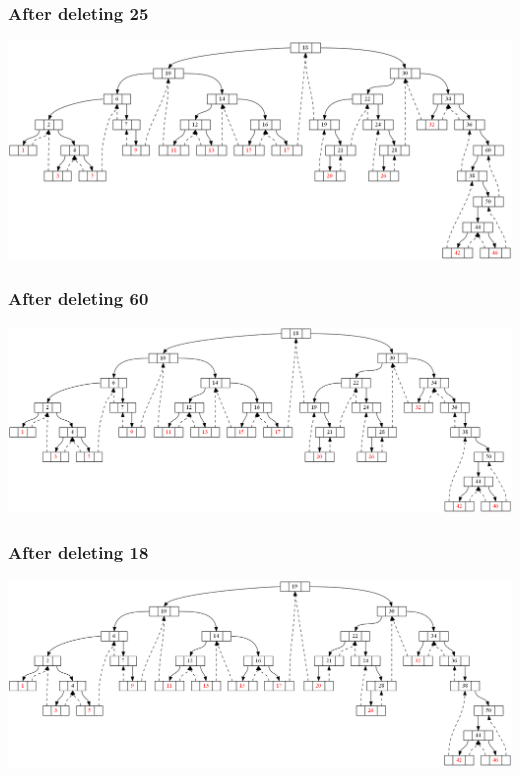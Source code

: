 \documentclass{article}
\begin{document}
\subsubsection{After deleting 25}
\begin{center}
\includegraphics[scale=0.3]{struct1.png}
\end{center}
\subsubsection{After deleting 60}
\begin{center}
\includegraphics[scale=0.3]{struct2.png}
\end{center}
\subsubsection{After deleting 18}
\begin{center}
\includegraphics[scale=0.3]{struct3.png}
\end{center}
\end{document}
